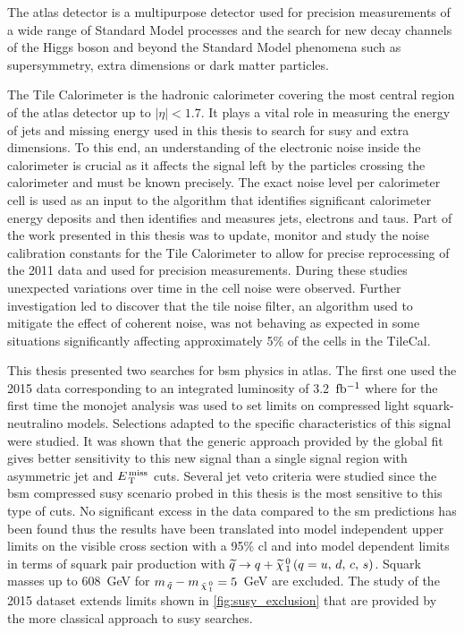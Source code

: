 The \gls{atlas} detector is a multipurpose detector used for precision
measurements of a wide range of Standard Model processes and the search for new
decay channels of the Higgs boson and beyond the Standard Model phenomena such
as supersymmetry, extra dimensions or dark matter particles.

The Tile Calorimeter is the hadronic calorimeter covering the most central
region of the \gls{atlas} detector up to $|\eta| < 1.7$. It plays a vital role
in measuring the energy of jets and missing energy used in this thesis to search
for \gls{susy} and extra dimensions. To this end, an understanding of the
electronic noise inside the calorimeter is crucial as it affects the signal left
by the particles crossing the calorimeter and must be known precisely. The exact
noise level per calorimeter cell is used as an input to the algorithm that
identifies significant calorimeter energy deposits and then identifies and
measures jets, electrons and taus. Part of the work presented in this thesis was
to update, monitor and study the noise calibration constants for the Tile
Calorimeter to allow for precise reprocessing of the 2011 data and used for
precision measurements. During these studies unexpected variations over time in
the cell noise were observed. Further investigation led to discover that the
tile noise filter, an algorithm used to mitigate the effect of coherent noise,
was not behaving as expected in some situations significantly affecting
approximately 5\% of the cells in the TileCal.

This thesis presented two searches for \gls{bsm} physics in \gls{atlas}. The
first one used the 2015 data corresponding to an integrated luminosity of
3.2~$\mbox{fb$^{-1}$}$ where for the first time the monojet analysis was used to set limits
on compressed light squark-neutralino models. Selections adapted to the specific
characteristics of this signal were studied. It was shown that the generic
approach provided by the global fit gives better sensitivity to this new signal
than a single signal region with asymmetric jet and $E_\mathrm{\, T}^\mathrm{\, miss}$ cuts. Several jet
veto criteria were studied since the \gls{bsm} compressed \gls{susy} scenario
probed in this thesis is the most sensitive to this type of cuts. No significant
excess in the data compared to the \gls{sm} predictions has been found thus the
results have been translated into model independent upper limits on the visible
cross section with a 95\% \gls{cl} and into model dependent limits in terms of
squark pair production with $\widetilde{q} \rightarrow q + \widetilde{\chi}_{\, 1}^{\, 0}\, (q = u,\, d,\, c,\, s)$. Squark masses up to 608~GeV for
$m_{\, \tilde{q}} - m_{\, \tilde{\chi}_{\, 1}^{\, 0}} = 5$~GeV are excluded. The study of the 2015 dataset
extends limits shown in \cref{fig:susy_exclusion} that are provided by the more
classical approach to \gls{susy} searches.

